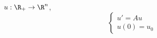 

\begin{note}
  $u:\R_+ \rightarrow \R^n$,
    \[
        \left\{\begin{array}{l}
            u' = Au \\
            u(0) = u_0
        \end{array}\right.
    \]
\end{note}
